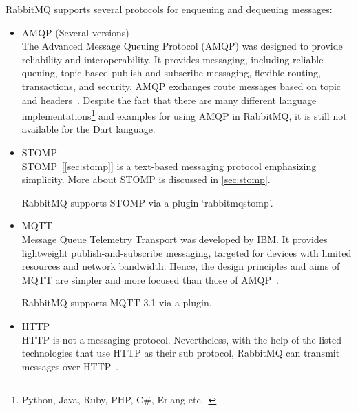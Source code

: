 RabbitMQ supports several protocols for enqueuing and dequeuing messages:
\begin{itemize}
  \item AMQP (Several versions)\\
  The Advanced Message Queuing Protocol (AMQP) was designed to provide reliability and interoperability. It provides messaging, including reliable queuing, topic-based publish-and-subscribe messaging, flexible routing, transactions, and security. AMQP exchanges route messages based on topic and headers~\cite{andyPiperVmware}.
  Despite the fact that there are many different language implementations\footnote{Python, Java, Ruby, PHP, C\#, Erlang etc.~\cite{rabbitmqGetstarted}} and examples for using AMQP in RabbitMQ, it is still not available for the Dart language.

  \item STOMP\\
  STOMP~[\autoref{sec:stomp}] is a text-based messaging protocol emphasizing simplicity. More about STOMP is discussed in \autoref{sec:stomp}.

  RabbitMQ supports STOMP via a plugin \textendash{} ‘rabbitmq\textunderscore{}stomp’.

  \item MQTT\\
  Message Queue Telemetry Transport was developed by IBM. It provides lightweight publish-and-subscribe messaging, targeted for devices with limited resources and network bandwidth. Hence, the design principles and aims of MQTT are simpler and more focused than those of AMQP~\cite{andyPiperVmware}.

  RabbitMQ supports MQTT 3.1 via a plugin.
  \item HTTP\\
  HTTP is not a messaging protocol. Nevertheless, with the help of the listed technologies that use HTTP as their sub protocol, RabbitMQ can transmit messages over HTTP~\cite{rabbitmqProtocols}.

\end{itemize}

